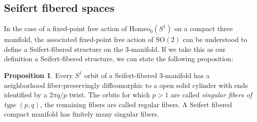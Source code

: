 \documentclass[10pt, oneside]{article}
\newcommand{\R}{\mathbb{R}}
\newcommand{\Z}{\mathbb{Z}}
\newtheorem{thm}{Theorem}
\theoremstyle{definition}
\newtheorem{prop}{Proposition}
\theoremstyle{definition}
\begin{document}
    
    

\subsection{Seifert fibered spaces}
    In the case of a fixed-point free action of $\text{Homeo}_0(S^1)$ on a compact three manifold, the associated fixed-point free action of $\text{SO}(2)$ can be understood to define a Seifert-fibered structure on the 3-manifold. If we take this as our definition a Seifert-fibered structure, we can state the following proposition:

    \begin{prop}
        Every $S^1$ orbit of a Seifert-fibered 3-manifold has a neighborhood fiber-preservingly diffeomorphic to a open solid cylinder with ends identified by a $2\pi q/p$ twist. The orbits for which $p>1$ are called {\it singular fibers of type $(p, q)$}, the remaining fibers are called regular fibers. A Seifert fibered compact manifold has finitely many singular fibers.
    \end{prop}
\end{document}
